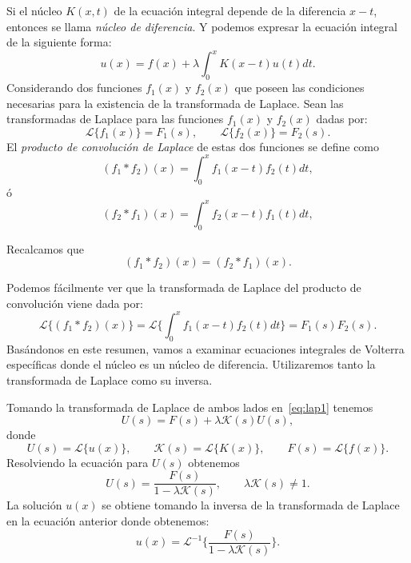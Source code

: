 Si el núcleo $K(x,t)$ de la ecuación integral depende de la diferencia $x - t$, entonces se llama \textit{núcleo de diferencia}. Y podemos expresar la ecuación integral de la siguiente forma:
\begin{equation}\label{eq:lap1}
	u(x) = f(x) + \lambda \int_0^x K(x - t)u(t)dt.
\end{equation}
Considerando dos funciones $f_1(x)$ y $f_2(x)$ que poseen las condiciones necesarias para la existencia de la transformada de Laplace. Sean las transformadas de Laplace para las funciones $f_1(x)$ y $f_2(x)$ dadas por:
\begin{equation}
	\mathcal{L}\{f_1(x)\} = F_1(s), \qquad \mathcal{L}\{f_2(x)\} = F_2(s).
\end{equation}
El \textit{producto de convolución de Laplace} de estas dos funciones se define como
\begin{equation}
	(f_1 \ast f_2)(x) = \int_{0}^{x} f_1(x-t)f_2(t)dt,
\end{equation}
ó
\begin{equation}
	(f_2 \ast f_1)(x) = \int_{0}^{x} f_2(x-t)f_1(t)dt,
\end{equation}
\begin{observacion}
	Recalcamos que
	\begin{equation}
		(f_1 \ast f_2)(x) = (f_2 \ast f_1)(x).
	\end{equation}
\end{observacion}
Podemos fácilmente ver que la transformada de Laplace del producto de convolución viene dada por:
\begin{equation}
	\mathcal{L}\{(f_1 \ast f_2)(x)\} = \mathcal{L}\{\int_{0}^{x}f_1(x-t)f_2(t)dt\} = F_1(s)F_2(s).
\end{equation}
Basándonos en este resumen, vamos a examinar ecuaciones integrales de Volterra específicas donde el núcleo es un núcleo de diferencia. Utilizaremos tanto la transformada de Laplace como su inversa.

Tomando la transformada de Laplace de ambos lados en~\eqref{eq:lap1} tenemos
\begin{equation}
	U(s) = F(s) + \lambda \mathcal{K}(s)U(s),
\end{equation}
donde
\begin{equation}
	U(s) = \mathcal{L}\{u(x)\}, \qquad \mathcal{K}(s) = \mathcal{L}\{K(x)\}, \qquad F(s) = \mathcal{L}\{f(x)\}.
\end{equation}
Resolviendo la ecuación para $U(s)$ obtenemos
\begin{equation}
	U(s) = \dfrac{F(s)}{1-\lambda \mathcal{K}(s)}, \qquad \lambda \mathcal{K}(s) \neq 1.
\end{equation}
La solución $u(x)$ se obtiene tomando la inversa de la transformada de Laplace en la ecuación anterior donde obtenemos:
\begin{equation}
	u(x) = \mathcal{L}^{-1}\{\dfrac{F(s)}{1-\lambda \mathcal{K}(s)}\}.
\end{equation}

